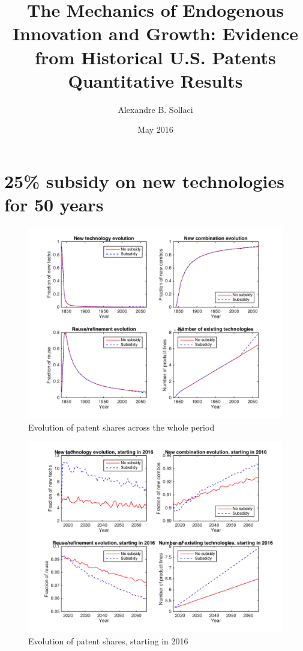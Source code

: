 \documentclass[a4paper,11pt]{article}
\theoremstyle{prop}
\theoremstyle{lemma}
\begin{document}
\title{The Mechanics of Endogenous Innovation and Growth: Evidence from Historical U.S. Patents \\
Quantitative Results}
\author{Alexandre B. Sollaci}
\date{May 2016}
\maketitle

\section*{25\% subsidy on new technologies for 50 years}

\begin{table}[h!]

\end{table}

\begin{figure}[h!]
\centering
\includegraphics[scale=.6]{patentsNT_50y}
\caption{Evolution of patent shares across the whole period}
\end{figure}

\begin{figure}
\centering
\includegraphics[scale=.6]{patents2016NT_50y}
\caption{Evolution of patent shares, starting in 2016}
\end{figure}
\end{document}
